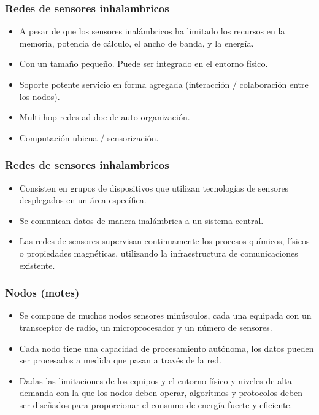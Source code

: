 \documentclass{beamer}
\begin{document}
\begin{frame}
\frametitle{Redes de sensores inhalambricos}
\begin{itemize}
\item A pesar de que los sensores inalámbricos ha limitado los recursos en la memoria, potencia de cálculo, el ancho de banda, y la energía.
\item Con un tamaño pequeño. Puede ser integrado en el entorno físico.
\item Soporte potente servicio en forma agregada (interacción / colaboración entre los nodos).
\item Multi-hop redes ad-doc de auto-organización.
\item Computación ubicua / sensorización.
\end{itemize}
\end{frame}

\begin{frame}
\frametitle{Redes de sensores inhalambricos}
\begin{itemize}
\item Consisten en grupos de dispositivos que utilizan tecnologías de sensores desplegados en un área específica.
\item Se comunican datos de manera inalámbrica a un sistema central. 
\item Las redes de sensores supervisan continuamente los procesos químicos, físicos o propiedades magnéticas, utilizando la infraestructura de comunicaciones existente.
\end{itemize}
\end{frame}

\begin{frame}
\frametitle{Nodos (motes)}
\begin{itemize}
\item Se compone de muchos nodos sensores minúsculos, cada una equipada con un transceptor de radio, un microprocesador y un número de sensores.
\item Cada nodo tiene una capacidad de procesamiento autónoma, los datos pueden ser procesados a medida que pasan a través de la red. 
\item Dadas las limitaciones de los equipos y el entorno físico y niveles de alta demanda con la que los nodos deben operar, algoritmos y protocolos deben ser diseñados para proporcionar el consumo de energía fuerte y eficiente.
\end{itemize}
\end{frame}
\end{document}
